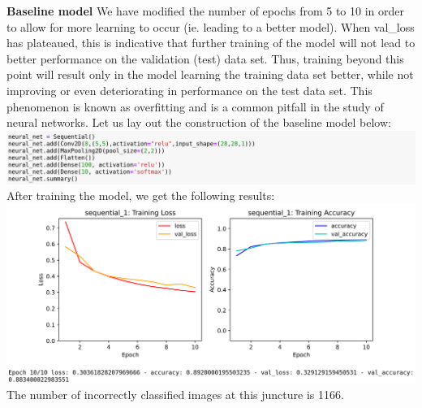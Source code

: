 \documentclass[11pt]{article}
\begin{document}
\begin{center}


{\bf Baseline model}
\linebreak
We have modified the number of epochs from 5 to 10 in order to allow for more learning to occur (ie. leading to a better model).
When val\_loss has plateaued, this is indicative that further training of the model will not lead to better performance on the validation (test) data set. Thus, training beyond this point will result only in the model learning the training data set better, while not improving or even deteriorating in performance on the test data set. This phenomenon is known as overfitting and is a common pitfall in the study of neural networks.
\linebreak
Let us lay out the construction of the baseline model below:
\includegraphics[scale=0.25]{Baseline_construct}
After training the model, we get the following results:
\includegraphics[scale=0.25]{Baseline_train}
The number of incorrectly classified images at this juncture is 1166.


\end{center}
\end{document}
